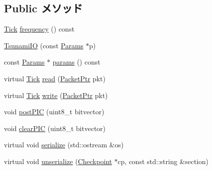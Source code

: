 \subsection*{Public メソッド}
\begin{DoxyCompactItemize}
\item 
\hyperlink{base_2types_8hh_a5c8ed81b7d238c9083e1037ba6d61643}{Tick} \hyperlink{classTsunamiIO_ae7d31c6aab76d9d4e74e5e7227337651}{frequency} () const 
\item 
\hyperlink{classTsunamiIO_a8efaf6e7ccc23f00c50f96eb2cefc742}{TsunamiIO} (const \hyperlink{classTsunamiIO_a46efefdf21511fe3655f4589444a8479}{Params} $\ast$p)
\item 
const \hyperlink{classTsunamiIO_a46efefdf21511fe3655f4589444a8479}{Params} $\ast$ \hyperlink{classTsunamiIO_acd3c3feb78ae7a8f88fe0f110a718dff}{params} () const 
\item 
virtual \hyperlink{base_2types_8hh_a5c8ed81b7d238c9083e1037ba6d61643}{Tick} \hyperlink{classTsunamiIO_a613ec7d5e1ec64f8d21fec78ae8e568e}{read} (\hyperlink{classPacket}{PacketPtr} pkt)
\item 
virtual \hyperlink{base_2types_8hh_a5c8ed81b7d238c9083e1037ba6d61643}{Tick} \hyperlink{classTsunamiIO_a4cefab464e72b5dd42c003a0a4341802}{write} (\hyperlink{classPacket}{PacketPtr} pkt)
\item 
void \hyperlink{classTsunamiIO_a4b01cbf1b633d5c31fdf43b661f222e1}{postPIC} (uint8\_\-t bitvector)
\item 
void \hyperlink{classTsunamiIO_ac1aa8cd6747e47946be3f85d914a6e69}{clearPIC} (uint8\_\-t bitvector)
\item 
virtual void \hyperlink{classTsunamiIO_ad6272f80ae37e8331e3969b3f072a801}{serialize} (std::ostream \&os)
\item 
virtual void \hyperlink{classTsunamiIO_af100c4e9feabf3cd918619c88c718387}{unserialize} (\hyperlink{classCheckpoint}{Checkpoint} $\ast$cp, const std::string \&section)
\end{DoxyCompactItemize}
